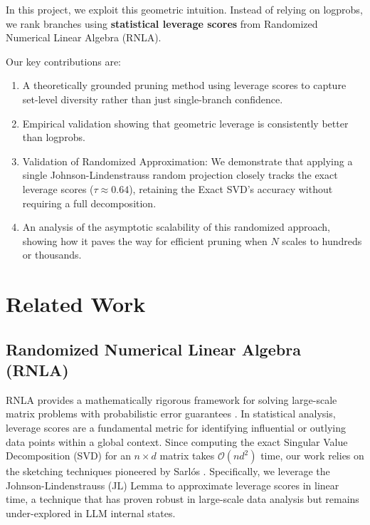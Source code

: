 \documentclass[11pt]{article}
\begin{document}
In this project, we exploit this geometric intuition. Instead of relying on logprobs, we rank branches using \textbf{statistical leverage scores} from Randomized Numerical Linear Algebra (RNLA). 

Our key contributions are:
\begin{enumerate}
  \item A theoretically grounded pruning method using leverage scores to capture set-level diversity
   rather than just single-branch confidence.
  \item Empirical validation showing that geometric leverage is consistently better than logprobs.
  \item Validation of Randomized Approximation: We demonstrate that applying a single Johnson-Lindenstrauss random projection closely tracks the exact leverage scores ($\tau \approx 0.64$), retaining the Exact SVD's accuracy without requiring a full decomposition.
  \item An analysis of the asymptotic scalability of this randomized approach, showing how it paves
   the way for efficient pruning when $N$ scales to hundreds or thousands.
\end{enumerate}


\section{Related Work}

\subsection{Randomized Numerical Linear Algebra (RNLA)}
RNLA provides a mathematically rigorous framework for solving large-scale matrix problems with probabilistic error guarantees \cite{Mahoney2011}. In statistical analysis, leverage scores are a fundamental metric for identifying influential or outlying data points within a global context. Since computing the exact Singular Value Decomposition (SVD) for an $n \times d$ matrix takes $\mathcal{O}(nd^2)$ time, our work relies on the sketching techniques pioneered by Sarl\'{o}s \cite{Sarlos2006}. Specifically, we leverage the Johnson-Lindenstrauss (JL) Lemma to approximate leverage scores in linear time, a technique that has proven robust in large-scale data analysis but remains under-explored in LLM internal states.
\end{document}
